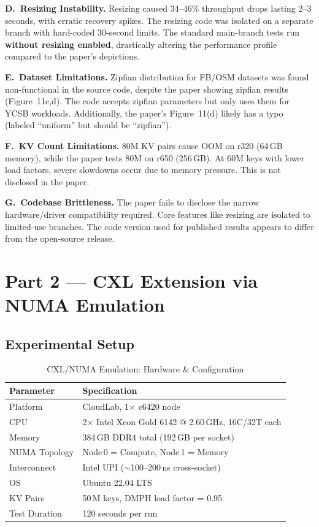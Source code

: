 \documentclass[11pt,a4paper]{article}
\begin{document}
\textbf{D.\ Resizing Instability.}
Resizing caused 34--46\% throughput drops lasting 2--3 seconds, with erratic recovery spikes. The resizing code was isolated on a separate branch with hard-coded 30-second limits. The standard main-branch tests run \textbf{without resizing enabled}, drastically altering the performance profile compared to the paper's depictions.

\textbf{E.\ Dataset Limitations.}
Zipfian distribution for FB/OSM datasets was found non-functional in the source code, despite the paper showing zipfian results (Figure~11c,d). The code accepts zipfian parameters but only uses them for YCSB workloads. Additionally, the paper's Figure~11(d) likely has a typo (labeled ``uniform'' but should be ``zipfian'').

\textbf{F.\ KV Count Limitations.}
80M KV pairs cause OOM on r320 (64\,GB memory), while the paper tests 80M on r650 (256\,GB). At 60M keys with lower load factors, severe slowdowns occur due to memory pressure. This is not disclosed in the paper.

\textbf{G.\ Codebase Brittleness.}
The paper fails to disclose the narrow hardware/driver compatibility required. Core features like resizing are isolated to limited-use branches. The code version used for published results appears to differ from the open-source release.

\section{Part 2 --- CXL Extension via NUMA Emulation}

\subsection{Experimental Setup}

\begin{table}[H]
\centering
\caption{CXL/NUMA Emulation: Hardware \& Configuration}
\label{tab:numa-setup}
\begin{tabular}{@{}ll@{}}
\toprule
\textbf{Parameter} & \textbf{Specification} \\
\midrule
Platform     & CloudLab, 1$\times$ c6420 node \\
CPU          & 2$\times$ Intel Xeon Gold 6142 @ 2.60\,GHz, 16C/32T each \\
Memory       & 384\,GB DDR4 total (192\,GB per socket) \\
NUMA Topology & Node\,0 = Compute, Node\,1 = Memory \\
Interconnect & Intel UPI ($\sim$100--200\,ns cross-socket) \\
OS           & Ubuntu 22.04 LTS \\
KV Pairs     & 50\,M keys, DMPH load factor = 0.95 \\
Test Duration & 120 seconds per run \\
\bottomrule
\end{tabular}
\end{table}
\end{document}
